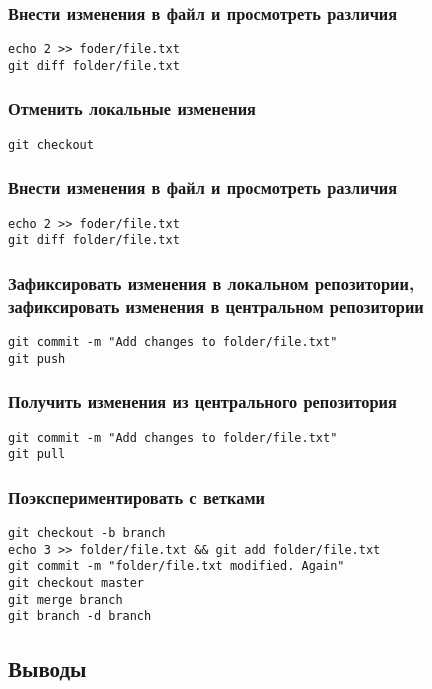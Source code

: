 \documentclass[12pt,a4paper]{article}
\begin{document}
\subsubsection{Внести изменения в файл и просмотреть различия}
\begin{verbatim}echo 2 >> foder/file.txt
git diff folder/file.txt
\end{verbatim}
\subsubsection{Отменить локальные изменения}
\begin{verbatim}git checkout
\end{verbatim}
\subsubsection{Внести изменения в файл и просмотреть различия}
\begin{verbatim}echo 2 >> foder/file.txt
git diff folder/file.txt
\end{verbatim}
\subsubsection{Зафиксировать изменения в локальном репозитории, зафиксировать изменения в центральном репозитории}
\begin{verbatim}git commit -m "Add changes to folder/file.txt"
git push
\end{verbatim}
\subsubsection{Получить изменения из центрального репозитория}
\begin{verbatim}git commit -m "Add changes to folder/file.txt"
git pull
\end{verbatim}
\subsubsection{Поэкспериментировать с ветками}
\begin{verbatim}
git checkout -b branch
echo 3 >> folder/file.txt && git add folder/file.txt
git commit -m "folder/file.txt modified. Again"
git checkout master
git merge branch
git branch -d branch
\end{verbatim}
\subsection{Выводы}
\end{document}
